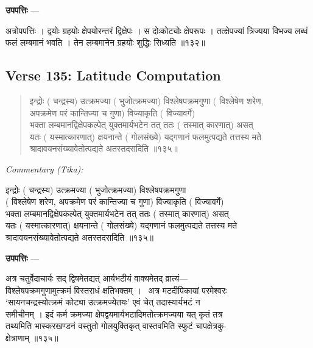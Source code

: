\documentclass[11pt,a4paper]{article}
\newcommand{\skt}[1]{{\devanagarifont\color{sktcolor} #1}}
\newenvironment{shloka}{%
  \begin{quote}%
  \smallskip%
  \devanagarifont\color{sktcolor}%
}{%
  \smallskip%
  \end{quote}%
}
\newenvironment{tika}{%
  \smallskip%
  \noindent\textit{Commentary (Tika):}\par%
  \smallskip%
  \hindifont\small%
}{%
  \par\smallskip%
}
\newenvironment{upapatti}{%
  \smallskip%
  \noindent\textbf{\devanagarifont उपपत्तिः} — \devanagarifont\small%
}{%
  \par\smallskip%
}
\begin{document}
\vspace{0.3cm}
\begin{upapatti}
\skt{अत्रोपपत्तिः} । द्वयोः ग्रहयोः क्षेपयोरन्तरं द्विक्षेपः । स दोःकोट्योः क्षेपरूपः । तत्क्षेपज्यां त्रिज्यया विभज्य लब्धं फलं लम्बमानं भवति । तेन लम्बमानेन ग्रहयोः शुद्धिः सिध्यति ॥१३२॥
\end{upapatti}

\subsection*{Verse 135: Latitude Computation}

\begin{shloka}
\skt{इन्द्रोः} (\skt{चन्द्रस्य}) \skt{उत्क्रमज्या} (\skt{भुजोत्क्रमज्या}) \skt{विश्लेषपक्रमगुणा} (\skt{विश्लेषेण शरेण,}\\
\skt{अपक्रमेण परं कान्तिज्या च गुणा}) \skt{विज्याकृति} (\skt{विज्यावर्गे})\\
\skt{भक्ता लम्बमानद्विक्षेपकल्पेत् युक्तमार्यभटेन तत् ततः} (\skt{तस्मात् कारणात्}) \skt{असत्}\\
\skt{यतः} (\skt{यस्मात्कारणात्}) \skt{क्षयनान्ते} (\skt{गोलसंख्ये}) \skt{यद्गणानं फलमुत्पद्यते तत्तस्य मते}\\
\skt{श्रादावयनसंख्यावेतोत्पद्यते अतस्तदसदिति} ॥१३५॥
\end{shloka}

\vspace{0.3cm}
\begin{tika}
\skt{इन्द्रोः} (\skt{चन्द्रस्य}) \skt{उत्क्रमज्या} (\skt{भुजोत्क्रमज्या}) \skt{विश्लेषपक्रमगुणा}\\
(\skt{विश्लेषेण शरेण, अपक्रमेण परं कान्तिज्या च गुणा}) \skt{विज्याकृति} (\skt{विज्यावर्गे})\\
\skt{भक्ता लम्बमानद्विक्षेपकल्पेत् युक्तमार्यभटेन तत् ततः} (\skt{तस्मात् कारणात्}) \skt{असत्}\\
\skt{यतः} (\skt{यस्मात्कारणात्}) \skt{क्षयनान्ते} (\skt{गोलसंख्ये}) \skt{यद्गणानं फलमुत्पद्यते तत्तस्य मते}\\
\skt{श्रादावयनसंख्यावेतोत्पद्यते अतस्तदसदिति} ॥१३५॥
\end{tika}

\vspace{0.5cm}

\begin{upapatti}
अत्र चतुर्वेदाचार्यः \skt{सद् द्विषमेतद्यत् आर्यभटीयं वाक्यमेतद् व्रात्यं—}\\[0.5em]
\skt{विश्लेषपक्रमगुणामुत्क्रमं विस्तराधं क्षतिभक्तम् ।}\
\skt{अत्र मटदीपिकायां परमेश्वरः}\\
\skt{`सायनचन्द्रस्योत्क्रमं कोट्या उत्क्रमज्येतयः' एवं चेत् तदास्यार्यभटं न}\\
\skt{समीचीनम् । इदं कर्म क्रमज्या क्षेपद्वयमार्यभटादिमतोत्क्रमज्यया यत् कृतं तत्र}\\
\skt{तथ्यमिति भास्करखण्डनं वस्तुतो गोलयुक्तिकृत् वास्तवमिति स्फुटं चापक्षेत्रकु-}\\
\skt{क्षेत्राणाम्} ॥१३५॥
\end{upapatti}
\end{document}
